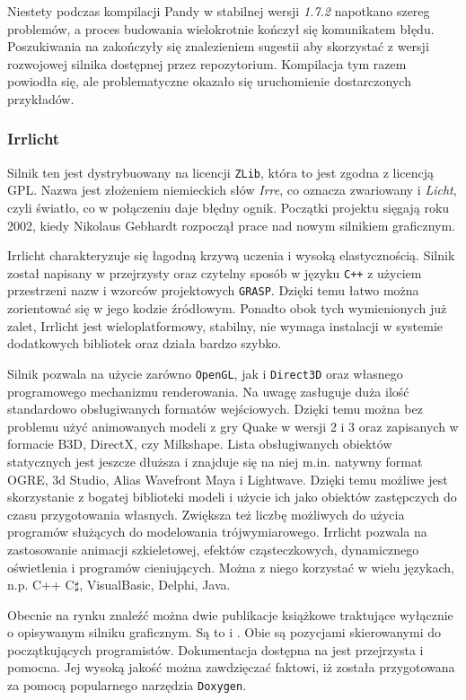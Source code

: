 \documentclass[11pt]{mwrep}
\begin{document}
      Niestety podczas kompilacji Pandy w stabilnej wersji \textit{1.7.2} napotkano szereg problemów, a proces budowania wielokrotnie kończył się komunikatem błędu. Poszukiwania na \cite{pandaf} zakończyły się znalezieniem sugestii aby skorzystać z wersji rozwojowej silnika dostępnej przez repozytorium. Kompilacja tym razem powiodła się, ale problematyczne okazało się uruchomienie dostarczonych przykładów.

      \subsubsection{Irrlicht}

      Silnik ten jest dystrybuowany na licencji \texttt{ZLib}, która to jest zgodna z licencją GPL. Nazwa jest złożeniem niemieckich słów \textit{Irre}, co oznacza zwariowany i \textit{Licht}, czyli światło, co w połączeniu daje błędny ognik. Początki projektu sięgają roku 2002, kiedy Nikolaus Gebhardt rozpoczął prace nad nowym silnikiem graficznym.

      Irrlicht charakteryzuje się łagodną krzywą uczenia i wysoką elastycznością. Silnik został napisany w przejrzysty oraz czytelny sposób w języku \texttt{C++} z użyciem przestrzeni nazw i wzorców projektowych \texttt{GRASP}. Dzięki temu łatwo można zorientować się w jego kodzie źródłowym. Ponadto obok tych wymienionych już zalet, Irrlicht jest wieloplatformowy, stabilny, nie wymaga instalacji w systemie dodatkowych bibliotek oraz działa bardzo szybko. 

      Silnik pozwala na użycie zarówno \texttt{OpenGL}, jak i \texttt{Direct3D} oraz własnego programowego mechanizmu renderowania. Na uwagę zasługuje duża ilość standardowo obsługiwanych formatów wejściowych. Dzięki temu można bez problemu użyć animowanych modeli z gry Quake w wersji 2 i 3 oraz zapisanych w formacie B3D, DirectX, czy Milkshape. Lista obsługiwanych obiektów statycznych jest jeszcze dłuższa i znajduje się na niej m.in. natywny format OGRE, 3d Studio, Alias Wavefront Maya i Lightwave. Dzięki temu możliwe jest skorzystanie z bogatej biblioteki modeli i użycie ich jako obiektów zastępczych do czasu przygotowania własnych. Zwiększa też liczbę możliwych do użycia programów służących do modelowania trójwymiarowego. Irrlicht pozwala na zastosowanie animacji szkieletowej, efektów cząsteczkowych, dynamicznego oświetlenia i programów cieniujących. Można z niego korzystać w wielu językach, n.p. C++ C$\sharp$, VisualBasic, Delphi, Java.

       Obecnie na rynku znaleźć można dwie publikacje książkowe traktujące wyłącznie o opisywanym silniku graficznym. Są to \cite{irrlichtb1} i \cite{irrlichtb2}. Obie są pozycjami skierowanymi do początkujących programistów. Dokumentacja dostępna na \cite{irrlichtw} jest przejrzysta i pomocna. Jej wysoką jakość można zawdzięczać faktowi, iż została przygotowana za pomocą popularnego narzędzia \texttt{Doxygen}.
\end{document}
